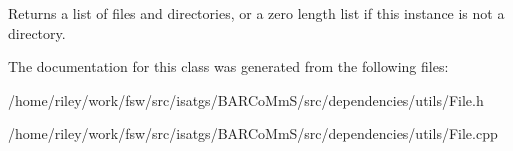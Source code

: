 \begin{DoxyReturn}{Returns}
a list of files and directories, or a zero length list if this instance is not a directory. 
\end{DoxyReturn}


The documentation for this class was generated from the following files\+:\begin{DoxyCompactItemize}
\item 
/home/riley/work/fsw/src/isatgs/\+B\+A\+R\+Co\+Mm\+S/src/dependencies/utils/File.\+h\item 
/home/riley/work/fsw/src/isatgs/\+B\+A\+R\+Co\+Mm\+S/src/dependencies/utils/File.\+cpp\end{DoxyCompactItemize}
